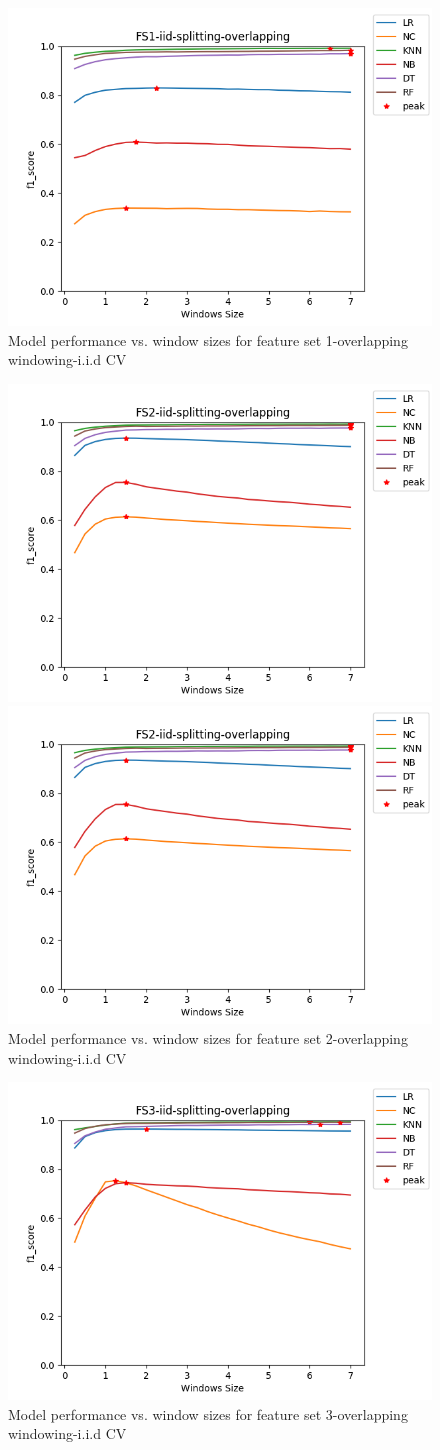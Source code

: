 

\begin{figure}[h]
    \centering
    \includegraphics[width=.3\textwidth]{Figures/FS1-iid-splitting-overlapping.png}
    \caption{Model performance vs. window sizes for feature set 1-overlapping windowing-i.i.d CV}
    \label{fig:iid-over-fs1}
\end{figure}

\begin{figure}[h]
    \centering
    \includegraphics[width=.3\textwidth]{Figures/FS2-iid-splitting-overlapping.png}
    
        \includegraphics[width=.3\textwidth]{Figures/FS2-iid-splitting-overlapping.png}

   
    \caption{Model performance vs. window sizes for feature set 2-overlapping windowing-i.i.d CV}
    \label{fig:iid-over-fs2}
\end{figure}

\begin{figure}[h]
    \centering
    \includegraphics[width=.3\textwidth]{Figures/FS3-iid-splitting-overlapping.png}
    \caption{Model performance vs. window sizes for feature set 3-overlapping windowing-i.i.d CV}
    \label{fig:iid-over-fs3}
\end{figure}


